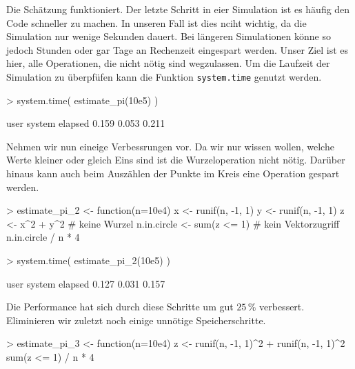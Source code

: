 Die Schätzung funktioniert. Der letzte Schritt in eier Simulation ist es häufig den Code schneller zu machen. In unseren Fall ist dies nciht wichtig, da die Simulation nur wenige Sekunden dauert. Bei längeren Simulationen könne so jedoch Stunden oder gar Tage an Rechenzeit eingespart werden. Unser Ziel ist es hier, alle Operationen, die nicht nötig sind wegzulassen. Um die Laufzeit der Simulation zu überpfüfen kann die Funktion \texttt{system.time} genutzt werden.

\begin{Schunk}
\begin{Sinput}
> system.time({
   estimate_pi(10e5)
 })   
\end{Sinput}
\begin{Soutput}
   user  system elapsed 
  0.159   0.053   0.211 
\end{Soutput}
\end{Schunk}

Nehmen wir nun eineige Verbessrungen vor. Da wir nur wissen wollen, welche Werte kleiner oder gleich Eins sind ist die Wurzeloperation nicht nötig. Darüber hinaus kann auch beim Auszählen der Punkte im Kreis eine Operation gespart werden.

\begin{Schunk}
\begin{Sinput}
> estimate_pi_2 <- function(n=10e4){
   x <- runif(n, -1, 1)
   y <- runif(n, -1, 1) 
   z <- x^2 + y^2                    # keine Wurzel
   n.in.circle <- sum(z <= 1)        # kein Vektorzugriff 
   n.in.circle / n * 4  
 } 
\end{Sinput}
\end{Schunk}

\begin{Schunk}
\begin{Sinput}
> system.time({
   estimate_pi_2(10e5)
 })   
\end{Sinput}
\begin{Soutput}
   user  system elapsed 
  0.127   0.031   0.157 
\end{Soutput}
\end{Schunk}

Die Performance hat sich durch diese Schritte um gut $25\,\%$ verbessert. Eliminieren wir zuletzt noch einige unnötige Speicherschritte.

\begin{Schunk}
\begin{Sinput}
> estimate_pi_3 <- function(n=10e4){ 
   z <- runif(n, -1, 1)^2 + 
        runif(n, -1, 1)^2
   sum(z <= 1) / n * 4 
 } 
\end{Sinput}
\end{Schunk}

